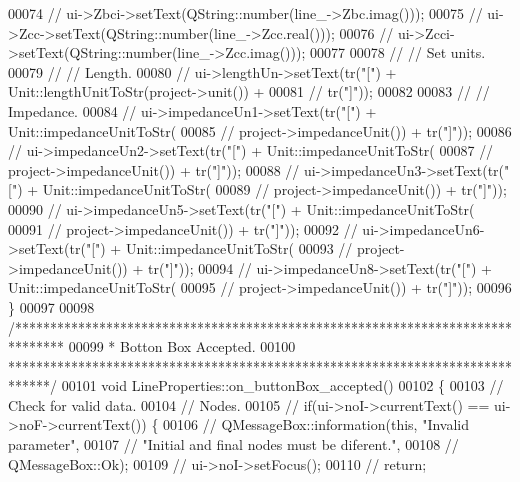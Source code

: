 \begin{DoxyCode}
00074 \textcolor{comment}{//  ui->Zbci->setText(QString::number(line\_->Zbc.imag()));}
00075 \textcolor{comment}{//  ui->Zcc->setText(QString::number(line\_->Zcc.real()));}
00076 \textcolor{comment}{//  ui->Zcci->setText(QString::number(line\_->Zcc.imag()));}
00077 
00078 \textcolor{comment}{//  // Set units.}
00079 \textcolor{comment}{//  // Length.}
00080 \textcolor{comment}{//  ui->lengthUn->setText(tr("[") + Unit::lengthUnitToStr(project->unit()) +}
00081 \textcolor{comment}{//                        tr("]"));}
00082 
00083 \textcolor{comment}{//  // Impedance.}
00084 \textcolor{comment}{//  ui->impedanceUn1->setText(tr("[") + Unit::impedanceUnitToStr(}
00085 \textcolor{comment}{//                              project->impedanceUnit()) + tr("]"));}
00086 \textcolor{comment}{//  ui->impedanceUn2->setText(tr("[") + Unit::impedanceUnitToStr(}
00087 \textcolor{comment}{//                              project->impedanceUnit()) + tr("]"));}
00088 \textcolor{comment}{//  ui->impedanceUn3->setText(tr("[") + Unit::impedanceUnitToStr(}
00089 \textcolor{comment}{//                              project->impedanceUnit()) + tr("]"));}
00090 \textcolor{comment}{//  ui->impedanceUn5->setText(tr("[") + Unit::impedanceUnitToStr(}
00091 \textcolor{comment}{//                              project->impedanceUnit()) + tr("]"));}
00092 \textcolor{comment}{//  ui->impedanceUn6->setText(tr("[") + Unit::impedanceUnitToStr(}
00093 \textcolor{comment}{//                              project->impedanceUnit()) + tr("]"));}
00094 \textcolor{comment}{//  ui->impedanceUn8->setText(tr("[") + Unit::impedanceUnitToStr(}
00095 \textcolor{comment}{//                              project->impedanceUnit()) + tr("]"));}
00096 \}
00097 
00098 \textcolor{comment}{/*******************************************************************************}
00099 \textcolor{comment}{ * Botton Box Accepted.}
00100 \textcolor{comment}{ ******************************************************************************/}
00101 \textcolor{keywordtype}{void} LineProperties::on\_buttonBox\_accepted()
00102 \{
00103   \textcolor{comment}{// Check for valid data.}
00104   \textcolor{comment}{// Nodes.}
00105 \textcolor{comment}{//  if(ui->noI->currentText() == ui->noF->currentText()) \{}
00106 \textcolor{comment}{//    QMessageBox::information(this, "Invalid parameter",}
00107 \textcolor{comment}{//                             "Initial and final nodes must be diferent.",}
00108 \textcolor{comment}{//                             QMessageBox::Ok);}
00109 \textcolor{comment}{//    ui->noI->setFocus();}
00110 \textcolor{comment}{//    return;}

\end{DoxyCode}
